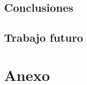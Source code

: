 \documentclass[a4paper, oneside, 11pt]{book}
\begin{document}
		\section{Conclusiones}
		
		
		\section{Trabajo futuro}
		
	
	\chapter{Anexo}\label{chap:anexo}
	
	
	
	\renewcommand{\refname}{\section{Bibliografía}}
	
	
	
	
	
\end{document}
